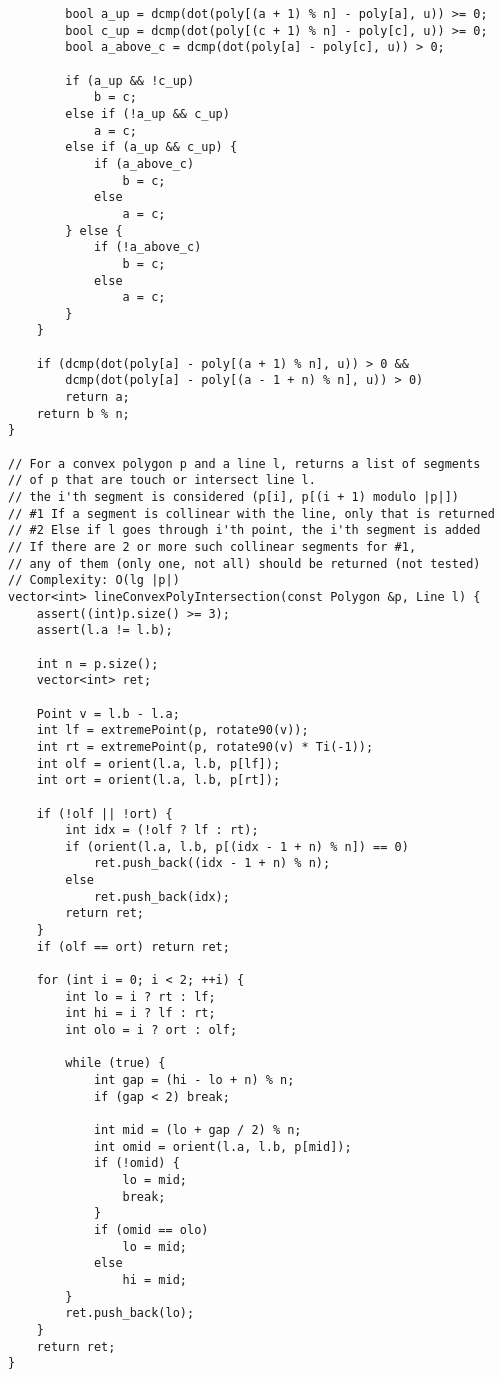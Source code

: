\documentclass[10pt,a4paper,onesided]{article}
\begin{document}
\begin{multicols*}{3}
\begin{lstlisting}
        bool a_up = dcmp(dot(poly[(a + 1) % n] - poly[a], u)) >= 0;
        bool c_up = dcmp(dot(poly[(c + 1) % n] - poly[c], u)) >= 0;
        bool a_above_c = dcmp(dot(poly[a] - poly[c], u)) > 0;

        if (a_up && !c_up)
            b = c;
        else if (!a_up && c_up)
            a = c;
        else if (a_up && c_up) {
            if (a_above_c)
                b = c;
            else
                a = c;
        } else {
            if (!a_above_c)
                b = c;
            else
                a = c;
        }
    }

    if (dcmp(dot(poly[a] - poly[(a + 1) % n], u)) > 0 &&
        dcmp(dot(poly[a] - poly[(a - 1 + n) % n], u)) > 0)
        return a;
    return b % n;
}

// For a convex polygon p and a line l, returns a list of segments
// of p that are touch or intersect line l.
// the i'th segment is considered (p[i], p[(i + 1) modulo |p|])
// #1 If a segment is collinear with the line, only that is returned
// #2 Else if l goes through i'th point, the i'th segment is added
// If there are 2 or more such collinear segments for #1,
// any of them (only one, not all) should be returned (not tested)
// Complexity: O(lg |p|)
vector<int> lineConvexPolyIntersection(const Polygon &p, Line l) {
    assert((int)p.size() >= 3);
    assert(l.a != l.b);

    int n = p.size();
    vector<int> ret;

    Point v = l.b - l.a;
    int lf = extremePoint(p, rotate90(v));
    int rt = extremePoint(p, rotate90(v) * Ti(-1));
    int olf = orient(l.a, l.b, p[lf]);
    int ort = orient(l.a, l.b, p[rt]);

    if (!olf || !ort) {
        int idx = (!olf ? lf : rt);
        if (orient(l.a, l.b, p[(idx - 1 + n) % n]) == 0)
            ret.push_back((idx - 1 + n) % n);
        else
            ret.push_back(idx);
        return ret;
    }
    if (olf == ort) return ret;

    for (int i = 0; i < 2; ++i) {
        int lo = i ? rt : lf;
        int hi = i ? lf : rt;
        int olo = i ? ort : olf;

        while (true) {
            int gap = (hi - lo + n) % n;
            if (gap < 2) break;

            int mid = (lo + gap / 2) % n;
            int omid = orient(l.a, l.b, p[mid]);
            if (!omid) {
                lo = mid;
                break;
            }
            if (omid == olo)
                lo = mid;
            else
                hi = mid;
        }
        ret.push_back(lo);
    }
    return ret;
}


\end{lstlisting}
\end{multicols*}
\end{document}

